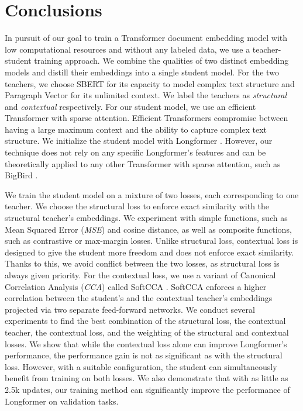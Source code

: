 \chapter*{Conclusions}

In pursuit of our goal to train a Transformer document embedding model with low
computational resources and without any labeled data, we use a teacher-student training
approach. We combine the qualities of two distinct embedding models and distill
their embeddings into a single student model. For the two teachers, we choose
SBERT \citep{reimers2019sentence} for its capacity to model complex text
structure and Paragraph Vector \citep{le2014distributed} for its unlimited
context. We label the teachers as \emph{structural} and \emph{contextual}
respectively. For our student model, we use an efficient Transformer with
sparse attention. Efficient Transformers compromise between having a large
maximum context and the ability to capture complex text structure. We
initialize the student model with Longformer \citep{beltagy2020longformer}.
However, our technique does not rely on any specific Longformer's features and
can be theoretically applied to any other Transformer with sparse attention,
such as BigBird \citep{zaheer2020big}.

We train the student model on a mixture of two losses, each corresponding to
one teacher. We choose the structural loss to enforce exact similarity with the
structural teacher's embeddings. We experiment with simple functions, such as
Mean Squared Error (\emph{MSE}) and cosine distance, as well as composite
functions, such as contrastive or max-margin losses. Unlike structural
loss, contextual loss is designed to give the student more freedom and does
not enforce exact similarity. Thanks to this, we avoid conflict between the two
losses, as structural loss is always given priority. For the contextual loss,
we use a variant of Canonical Correlation Analysis (\emph{CCA})
\citep{hotelling1992relations} called SoftCCA \citep{chen2016training}. SoftCCA
enforces a higher correlation between the student's and the contextual
teacher's embeddings projected via two separate feed-forward networks. We
conduct several experiments to find the best combination of the structural
loss, the contextual teacher, the contextual loss, and the weighting of the
structural and contextual losses. We show that while the contextual loss alone
can improve Longformer's performance, the performance gain is not as
significant as with the structural loss. However, with a suitable
configuration, the student can simultaneously benefit from training on both
losses. We also demonstrate that with as little as 2.5k updates, our training method can significantly improve the performance of Longformer on validation tasks.

